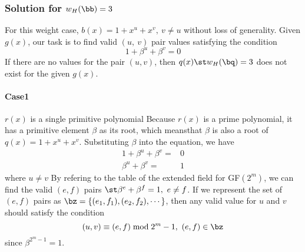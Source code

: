 

\subsubsection{Solution for $w_H(\bb) =3$}
For this weight case, \newline$b(x)=1+x^u+x^v,~v\neq u$ without loss of generality. Given $g(x)$, our task is to find valid $(u,~v)$ pair values satisfying the condition 
$$1+\beta^u+\beta^v=0$$
 If there are no values for the pair $(u,v)$, then $q(x) \st w_H(\bq) =3$ does not exist for the given $g(x)$.
\paragraph{ Case1} $r(x)$ is a single primitive polynomial \newline
Because $r(x)$ is a prime polynomial, it has a primitive element $\beta$ as its root, which means\newline that $\beta$ is also a root of $q(x)=1+x^u+x^v$. Substituting $\beta$ into the equation, we have 
\begin{equation}
\begin{split}
1+\beta^u+\beta^v=&0\\
\beta^u+\beta^v=&1
\end{split}
\end{equation}
where $u\neq v$
By refering to the table of the extended field for GF$(2^m)$, we can find the valid $(e,f)$ pairs $\st \beta^e+\beta^f=1,~e\neq f$.  If we represent the set of $(e,f)$ pairs as 
$\bz=\{ (e_1,f_1) ,( e_2,f_2),\cdots\} $, then any valid value for $u$ and $v$ should satisfy the condition
$$(u,v) \equiv (e,f) \bmod 2^m-1,~(e,f)\in \bz$$ since $\beta^{2^{m}-1}=1$.


